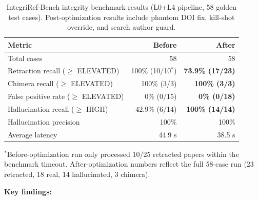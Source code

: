 \documentclass[sigconf,nonacm]{acmart}
\begin{document}
\begin{table}[t]
\caption{IntegriRef-Bench integrity benchmark results (L0+L4 pipeline, 58 golden test cases). Post-optimization results include phantom DOI fix, kill-shot override, and search author guard.}
\label{tab:integrity}
\centering
\small
\begin{tabular}{lrr}
\toprule
\textbf{Metric} & \textbf{Before} & \textbf{After} \\
\midrule
Total cases                      & 58 & 58 \\
\midrule
Retraction recall ($\geq$ ELEVATED) & 100\% (10/10$^*$) & \textbf{73.9\% (17/23)} \\
Chimera recall ($\geq$ ELEVATED)  & 100\% (3/3) & \textbf{100\% (3/3)} \\
False positive rate ($\geq$ ELEVATED) & 0\% (0/15) & \textbf{0\% (0/18)} \\
Hallucination recall ($\geq$ HIGH) & 42.9\% (6/14) & \textbf{100\% (14/14)} \\
Hallucination precision          & 100\% & 100\% \\
\midrule
Average latency                  & 44.9 s & 38.5 s \\
\bottomrule
\end{tabular}
\vspace{2pt}
{\footnotesize $^*$Before-optimization run only processed 10/25 retracted papers within the benchmark timeout. After-optimization numbers reflect the full 58-case run (23 retracted, 18 real, 14 hallucinated, 3 chimera).}
\end{table}

\textbf{Key findings:}
\end{document}
